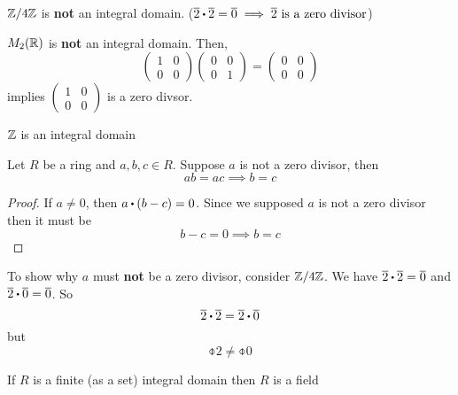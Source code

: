 \documentclass[../Main.tex]{subfiles}
\begin{document}
\begin{example}
	$\mathbb{Z}/4\mathbb{Z}$ is \textbf{not} an integral domain. ($\obar{2}\rdot \obar{2}=\obar{0}\implies \obar{2} \textrm{ is a zero divisor}$)
\end{example}
\begin{example}
	$M_2(\mathbb{R})$ is \textbf{not} an integral domain. Then,
	\[\begin{pmatrix}
	1&0\\0&0
	\end{pmatrix}\begin{pmatrix}
	0&0\\0&1
	\end{pmatrix}=\begin{pmatrix}
	0&0\\0&0
	\end{pmatrix}\]
	implies $\begin{pmatrix}
	1&0\\0&0
	\end{pmatrix}$ is a zero divsor.
\end{example}
\begin{example}
	$\mathbb{Z}$ is an integral domain
\end{example}
\begin{prop}[title=Cancellation Law]
	Let $R$ be a ring and $a,b,c\in R$.\newline
	Suppose $a$ is not a zero divisor, then
		\[ab=ac\implies b=c\]
\end{prop}
\begin{proof}
	If $a\ne0$, then $a\rdot (b-c)=0$. Since we supposed $a$ is not a zero divisor then it must be
	\[b-c=0 \implies b=c\]
\end{proof}
\begin{example}
	To show why $a$ must \textbf{not} be a zero divisor, consider $\mathbb{Z}/4\mathbb{Z}$. We have $\obar{2}\rdot \obar{2}=\obar{0}$ and $\obar{2}\rdot \obar{0}=\obar{0}$. So
	\[\obar{2}\rdot \obar{2}=\obar{2}\rdot \obar{0}\]
	but
	\[\obar{2}\ne \obar{0}\]
\end{example}
\begin{crl}[title = Finite integral domain is field]
	If $R$ is a finite (as a set) integral domain then $R$ is a field
\end{crl}
\end{document}
